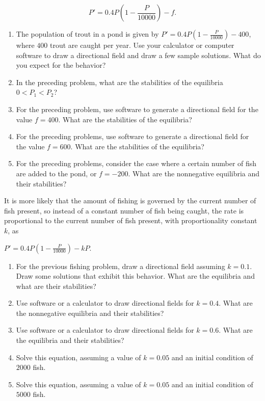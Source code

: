 \documentclass{exercises}
\begin{document}
\[
P'=0.4P\left(1-\frac{P}{10000}\right)-f.
\]

\begin{enumerate}[resume]
\item \techrequired The population of trout in a pond is given by $P'=0.4P(1-\frac{P}{10000})-400$, where $400$ trout are caught per year. Use your calculator or computer software to draw a directional field and draw a few sample solutions. What do you expect for the behavior?
\item In the preceding problem, what are the stabilities of the equilibria $0<P_{1}<P_{2}$?
\item \techrequired For the preceding problem, use software to generate a directional field for the value $f=400$. What are the stabilities of the equilibria?
\item \techrequired For the preceding problems, use software to generate a directional field for the value $f=600$. What are the stabilities of the equilibria?
\item \techrequired For the preceding problems, consider the case where a certain number of fish are added to the pond, or $f=-200$. What are the nonnegative equilibria and their stabilities?
\end{enumerate}

It is more likely that the amount of fishing is governed by the current number of fish present, so instead of a constant number of fish being caught, the rate is proportional to the current number of fish present, with proportionality constant $k$, as


$P'=0.4P(1-\frac{P}{10000})-kP$.

\begin{enumerate}[resume]
\item \techrequired For the previous fishing problem, draw a directional field assuming $k=0.1$. Draw some solutions that exhibit this behavior. What are the equilibria and what are their stabilities?
\item \techrequired Use software or a calculator to draw directional fields for $k=0.4$. What are the nonnegative equilibria and their stabilities?
\item \techrequired Use software or a calculator to draw directional fields for $k=0.6$. What are the equilibria and their stabilities?
\item Solve this equation, assuming a value of $k=0.05$ and an initial condition of $2000$ fish.
\item Solve this equation, assuming a value of $k=0.05$ and an initial condition of $5000$ fish.
\end{enumerate}
\end{document}

